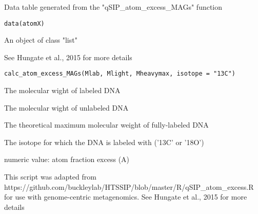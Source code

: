 \documentclass[a4paper]{book}
\begin{document}
%
\begin{Description}\relax
Data table generated from the "qSIP\_atom\_excess\_MAGs" function
\end{Description}
%
\begin{Usage}
\begin{verbatim}
data(atomX)
\end{verbatim}
\end{Usage}
%
\begin{Format}
An object of class "list"
\end{Format}
%
\begin{Description}\relax
See Hungate et al., 2015 for more details
\end{Description}
%
\begin{Usage}
\begin{verbatim}
calc_atom_excess_MAGs(Mlab, Mlight, Mheavymax, isotope = "13C")
\end{verbatim}
\end{Usage}
%
\begin{Arguments}
\begin{ldescription}
\item[\code{Mlab}] The molecular wight of labeled DNA

\item[\code{Mlight}] The molecular wight of unlabeled DNA

\item[\code{Mheavymax}] The theoretical maximum molecular weight of fully-labeled DNA

\item[\code{isotope}] The isotope for which the DNA is labeled with ('13C' or '18O')
\end{ldescription}
\end{Arguments}
%
\begin{Value}
numeric value: atom fraction excess (A)
\end{Value}
%
\begin{Description}\relax
This script was adapted from https://github.com/buckleylab/HTSSIP/blob/master/R/qSIP\_atom\_excess.R
for use with genome-centric metagenomics. See Hungate et al., 2015 for more details
\end{Description}
\end{document}
